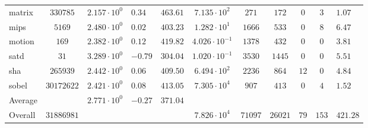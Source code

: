 \begin{tabular}{|l|c|HHc|c|c|c|c|cH|}
matrix        & $ 330785   $ & $ 2.157 \cdot 10^{0} $ & $ 0.34  $ & $ 463.61 $ & $ 7.135 \cdot 10^{2}  $ & $ 271   $ & $ 172   $ & $ 0   $ & $ 3   $ & $ 1.07    $ \\
mips          & $ 5169     $ & $ 2.480 \cdot 10^{0} $ & $ 0.02  $ & $ 403.23 $ & $ 1.282 \cdot 10^{1}  $ & $ 1666  $ & $ 533   $ & $ 0   $ & $ 8   $ & $ 6.47    $ \\
motion        & $ 169      $ & $ 2.382 \cdot 10^{0} $ & $ 0.12  $ & $ 419.82 $ & $ 4.026 \cdot 10^{-1} $ & $ 1378  $ & $ 432   $ & $ 0   $ & $ 0   $ & $ 3.81    $ \\
satd          & $ 31       $ & $ 3.289 \cdot 10^{0} $ & $ -0.79 $ & $ 304.04 $ & $ 1.020 \cdot 10^{-1} $ & $ 3530  $ & $ 1445  $ & $ 0   $ & $ 0   $ & $ 5.51    $ \\
sha           & $ 265939   $ & $ 2.442 \cdot 10^{0} $ & $ 0.06  $ & $ 409.50 $ & $ 6.494 \cdot 10^{2}  $ & $ 2236  $ & $ 864   $ & $ 12  $ & $ 0   $ & $ 4.84    $ \\
sobel         & $ 30172622 $ & $ 2.421 \cdot 10^{0} $ & $ 0.08  $ & $ 413.05 $ & $ 7.305 \cdot 10^{4}  $ & $ 907   $ & $ 413   $ & $ 0   $ & $ 4   $ & $ 1.52    $ \\
\hline
Average       & $          $ & $ 2.771 \cdot 10^{0} $ & $ -0.27 $ & $ 371.04 $ & $                     $ & $       $ & $       $ & $     $ & $     $ & $         $ \\
\hline
Overall       & $ 31886981 $ & $                    $ & $       $ & $        $ & $ 7.826 \cdot 10^{4}  $ & $ 71097 $ & $ 26021 $ & $ 79  $ & $ 153 $ & $ 421.28  $ \\
\hline
\end{tabular}
